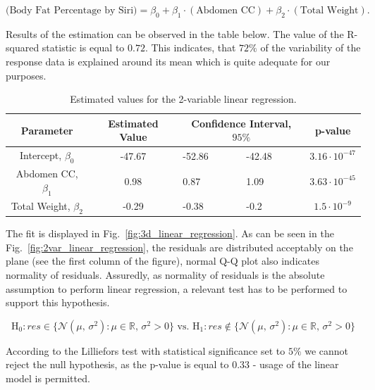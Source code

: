 \documentclass[11pt,american,american]{article}
\begin{document}
\begin{equation*}
	\text{(Body Fat Percentage by Siri)} = \beta_{0} + \beta_{1} \cdot (\text{Abdomen CC}) + \beta_{2} \cdot (\text{Total Weight}).
\end{equation*}

\medskip

Results of the estimation can be observed in the table below. The value of the R-squared statistic is equal to $0.72$. This indicates, that $72\%$ of the variability of the response data is explained around its mean which is quite adequate for our purposes. 

\renewcommand{\arraystretch}{1.2}
\begin{table}[H]
	\centering
	\begin{tabular}{|c||c||p{2cm}|p{2cm}|c|}
		\hline 
		Parameter &  Estimated Value & \multicolumn{2}{c|}{Confidence Interval, $95\%$} & p-value \\ 
		\hline \hline 
		Intercept, $\beta_{0}$ & -47.67 & -52.86 &  -42.48 & $3.16 \cdot 10^{-47}$  \\ 
		\hline 
		Abdomen CC, $\beta_{1}$ & 0.98 & 0.87 &  1.09 & $3.63 \cdot 10^{-45}$ \\ 
		\hline 
		Total Weight, $\beta_{2}$ & -0.29 & -0.38 & -0.2 & $1.5 \cdot 10^{-9}$ \\ 
		\hline 
	\end{tabular} 
\caption{Estimated values for the 2-variable linear regression.}
\end{table}

The fit is displayed in Fig.~\ref{fig:3d_linear_regression}. As can be seen in the Fig.~\ref{fig:2var_linear_regression}, the residuals are distributed acceptably on the plane (see the first column of the figure), normal Q-Q plot also indicates normality of residuals. Assuredly, as normality of residuals is the absolute assumption to perform linear regression, a relevant test has to be performed to support this hypothesis.

\begin{equation*}
	\text{H}_{0}: res \in \{ \mathcal{N} (\mu,\,\sigma^{2}): \mu \in \mathbb{R}, \, \sigma^{2} > 0 \} \text{ vs. }
	\text{H}_{1}: res \not\in \{ \mathcal{N} (\mu,\,\sigma^{2}): \mu \in \mathbb{R}, \, \sigma^{2} > 0 \}
\end{equation*}

\medskip

According to the Lilliefors test with statistical significance set to $5\%$ we cannot reject the null hypothesis, as the p-value is equal to $0.33$ - usage of the linear model is permitted.
\end{document}
